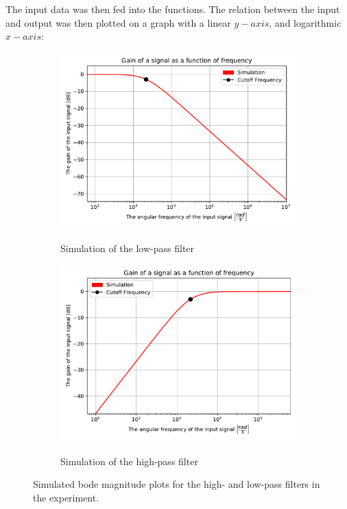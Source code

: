 \noindent The input data was then fed into the functions. The relation between the input and output was then plotted on a graph with a linear $y-axis$, and logarithmic $x-axis$:

\begin{figure}[H]
\centering
	\begin{subfigure}[b]{0.49\textwidth}
		\includegraphics[width=\textwidth]{fig/img/LPF_sim.pdf}
    		\label{fig:lpf_sim}
    		\caption{Simulation of the low-pass filter}
	\end{subfigure}
	\begin{subfigure}[b]{0.49\textwidth}
		\includegraphics[width=\textwidth]{fig/img/HPF_sim.pdf}
    		\label{fig:hpf_sim}
    		\caption{Simulation of the high-pass filter}
	\end{subfigure}
\caption{Simulated bode magnitude plots for the high- and low-pass filters in the experiment.}
\end{figure}

